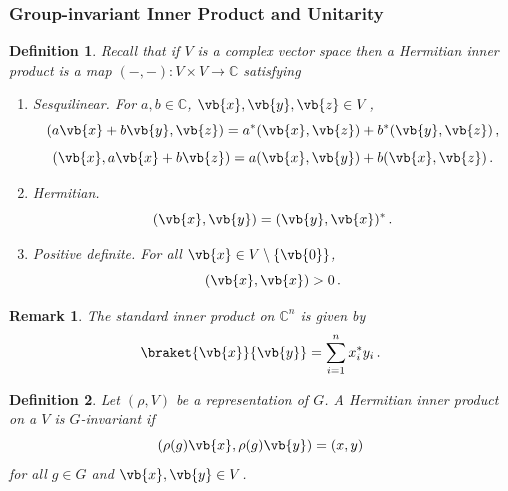 \documentclass{article}
\theoremstyle{plain}\theoremheaderfont{\normalfont\itshape}\theorembodyfont{\rmfamily}\theoremseparator{.}\newtheorem*{rem}{Remark}\newtheorem*{ex}{Example}\newtheorem*{proof}{Proof}\newtheorem*{altp}{Alternative proof}
\theoremstyle{plain}\theoremheaderfont{\normalfont\bfseries}\theorembodyfont{\rmfamily}\theoremseparator{.}\newtheorem{thm}{Theorem}[section]\newtheorem{lem}[thm]{Lemma}\newtheorem{prop}[thm]{Proposition}\newtheorem*{cor}{Corollary}\newtheorem{defn}[thm]{Definition}\newtheorem{clm}[thm]{Claim}\newtheorem{clminproof}{Claim}
\theoremstyle{break}\theoremheaderfont{\normalfont\itshape}\theorembodyfont{\rmfamily}\theoremseparator{.\medskip}\newtheorem*{proofskip}{Proof}\newtheorem*{exs}{Examples}\newtheorem*{rems}{Remarks}
\theoremstyle{break}\theoremheaderfont{\normalfont\bfseries}\theorembodyfont{\rmfamily}\theoremseparator{.\medskip}\newtheorem{lemskip}[thm]{Lemma}\newtheorem{defnskip}[thm]{Definition}\newtheorem{propskip}[thm]{Proposition}\newtheorem{thmskip}[thm]{Theorem}
\numberwithin{equation}{section}
\begin{document}
	\subsubsection{Group-invariant Inner Product and Unitarity}
	\begin{defn}
		Recall that if \(V\) is a complex vector space then a \textit{Hermitian inner product} is a map \((-, -): V \times V \to\mathbb{C}\) satisfying
		\begin{enumerate}[topsep=0pt]
			\item[(i)] \textit{Sesquilinear.} For \(a,b\in\mathbb{C}\), \(\vb{x},\vb{y},\vb{z}\in V\),
			\[(a\vb{x}+b\vb{y},\vb{z})=a^*(\vb{x},\vb{z})+b^*(\vb{y},\vb{z})\,,\]
			\[(\vb{x},a\vb{x}+b\vb{z})=a(\vb{x},\vb{y})+b(\vb{x},\vb{z})\,.\]
			\item[(ii)] \textit{Hermitian.}
			\[(\vb{x},\vb{y})=(\vb{y},\vb{x})^*\,.\]
			\item[(iii)] \textit{Positive definite.} For all \(\vb{x}\in V\setminus\{\vb{0}\}\),
			\[(\vb{x},\vb{x})>0\,.\]
		\end{enumerate}
	\end{defn}
	\begin{rem}
		The standard inner product on \(\mathbb{C}^n\) is given by
		\[\braket{\vb{x}}{\vb{y}}=\sum_{i=1}^{n}x_i^*y_i\,.\]
	\end{rem}
	\begin{defn}
		Let \((\rho,V)\) be a representation of \(G\). A Hermitian inner product on a \(V\) is \textit{\(G\)-invariant} if 
		\[(\rho(g)\vb{x}, \rho(g)\vb{y})=(x, y)\]
		for all \(g\in G\) and \(\vb{x},\vb{y}\in V\).
	\end{defn}
\end{document}

